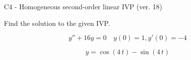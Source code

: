 \begin{exercise}
  \begin{exerciseTitle}C4 - Homogeneous second-order linear IVP (ver. 18)\end{exerciseTitle}
  \begin{exerciseStatement}
    
Find the solution to the given IVP.

    
\[y''+16y = 0 \hspace{1em} y(0) = 1 , y'(0) = -4\]

  \end{exerciseStatement}
  \begin{exerciseAnswer}
    
\[y= \cos\left(4 \, t\right) - \sin\left(4 \, t\right)\]

  \end{exerciseAnswer}
\end{exercise}